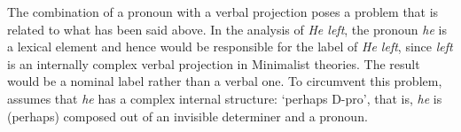 The combination of a pronoun with a verbal projection poses a problem that is related to what has
been said above. In the analysis of \emph{He left}, the pronoun \emph{he} is a lexical element and
hence would be responsible for the label of \emph{He left}, since \emph{left} is an internally
complex verbal projection in Minimalist theories. The result would be a nominal label rather than a
verbal one. To circumvent this problem, \citet[]{Chomsky2013a} assumes that \emph{he} has a
complex internal structure: `perhaps D-pro', that is, \emph{he} is (perhaps) composed out of an
invisible determiner and a pronoun.


